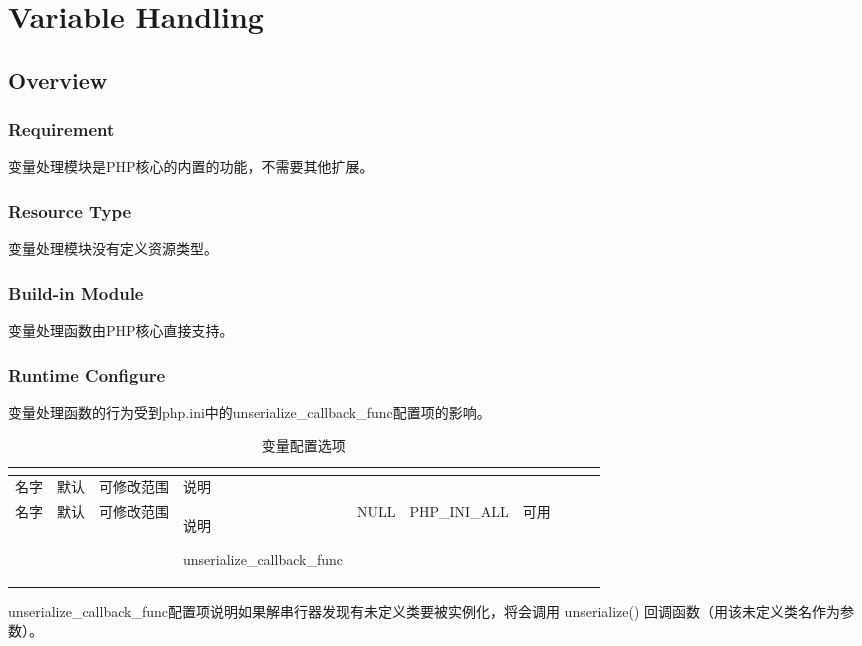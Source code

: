 \part{Variable Handling}


\chapter{Overview}




\section{Requirement}

变量处理模块是PHP核心的内置的功能，不需要其他扩展。

\section{Resource Type}

变量处理模块没有定义资源类型。


\section{Build-in Module}

变量处理函数由PHP核心直接支持。

\section{Runtime Configure}


变量处理函数的行为受到php.ini中的unserialize\_callback\_func配置项的影响。



\begin{longtable}{|m{100pt}|m{30pt}|m{50pt}|m{100pt}|}
\tabularnewline\hline
名字&默认&可修改范围&说明
\endhead

\caption{变量配置选项}\\
\hline
名字&默认&可修改范围&说明
\endfirsthead

\endfoot

\endlastfoot
\hline
unserialize\_callback\_func&NULL&PHP\_INI\_ALL&可用\\
\hline
\end{longtable}

unserialize\_callback\_func配置项说明如果解串行器发现有未定义类要被实例化，将会调用 unserialize() 回调函数（用该未定义类名作为参数）。

